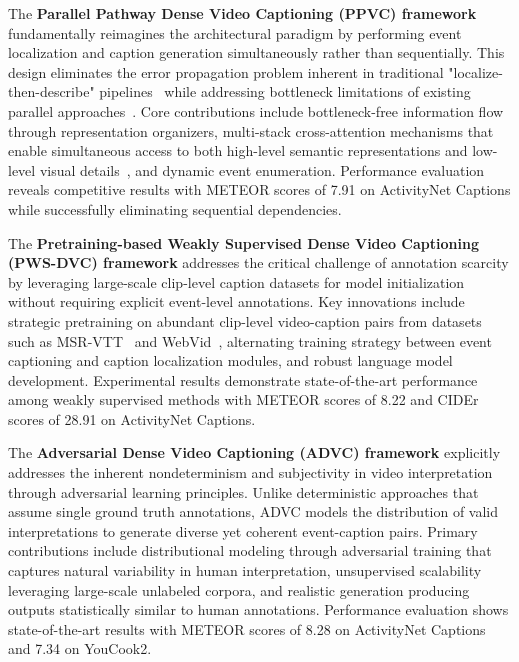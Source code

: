 The \textbf{Parallel Pathway Dense Video Captioning (PPVC) framework} fundamentally reimagines the architectural paradigm by performing event localization and caption generation simultaneously rather than sequentially. This design eliminates the error propagation problem inherent in traditional "localize-then-describe" pipelines~\cite{Krishna2017-pw,Zhou2018-zu} while addressing bottleneck limitations of existing parallel approaches~\cite{Wang2021-zi}. Core contributions include bottleneck-free information flow through representation organizers, multi-stack cross-attention mechanisms that enable simultaneous access to both high-level semantic representations and low-level visual details~\cite{Vaswani2017-sc}, and dynamic event enumeration. Performance evaluation reveals competitive results with METEOR scores of 7.91 on ActivityNet Captions while successfully eliminating sequential dependencies.

The \textbf{Pretraining-based Weakly Supervised Dense Video Captioning (PWS-DVC) framework} addresses the critical challenge of annotation scarcity by leveraging large-scale clip-level caption datasets for model initialization without requiring explicit event-level annotations. Key innovations include strategic pretraining on abundant clip-level video-caption pairs from datasets such as MSR-VTT~\cite{Xu2016-ti} and WebVid~\cite{Bain2021-si}, alternating training strategy between event captioning and caption localization modules, and robust language model development. Experimental results demonstrate state-of-the-art performance among weakly supervised methods with METEOR scores of 8.22 and CIDEr scores of 28.91 on ActivityNet Captions.

The \textbf{Adversarial Dense Video Captioning (ADVC) framework} explicitly addresses the inherent nondeterminism and subjectivity in video interpretation through adversarial learning principles. Unlike deterministic approaches that assume single ground truth annotations, ADVC models the distribution of valid interpretations to generate diverse yet coherent event-caption pairs. Primary contributions include distributional modeling through adversarial training that captures natural variability in human interpretation, unsupervised scalability leveraging large-scale unlabeled corpora, and realistic generation producing outputs statistically similar to human annotations. Performance evaluation shows state-of-the-art results with METEOR scores of 8.28 on ActivityNet Captions and 7.34 on YouCook2.

